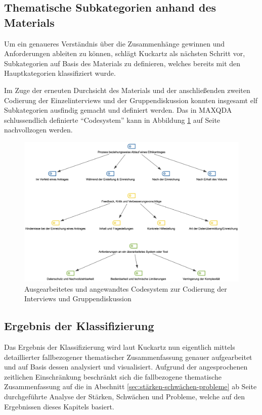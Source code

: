\documentclass[a4paper,12pt,twoside]{scrreprt}
\begin{document}
\subsection{Thematische Subkategorien anhand des Materials}
\label{sub-sec:thematische-subkategorien}

Um ein genaueres Verständnis über die Zusammenhänge gewinnen und Anforderungen ableiten zu können, schlägt Kuckartz als nächsten Schritt vor, Subkategorien auf Basis des Materials zu definieren, welches bereits mit den Hauptkategorien klassifiziert wurde. \cite[106]{kuckartz_qualitative_2018}

Im Zuge der erneuten Durchsicht des Materials und der anschließenden zweiten Codierung der Einzelinterviews und der Gruppendiskussion konnten insgesamt elf Subkategorien ausfindig gemacht und definiert werden. Das in MAXQDA schlussendlich definierte \enquote{Codesystem} kann in Abbildung \ref{fig:angewandtes-codesystem} auf Seite \pageref{fig:angewandtes-codesystem} nachvollzogen werden.

\begin{figure}[ht]
    \centering
    \includegraphics[width=\linewidth]{thesis/images/Luidold_Codesystem.png}
    \caption{Ausgearbeitetes und angewandtes Codesystem zur Codierung der Interviews und Gruppendiskussion}
    \label{fig:angewandtes-codesystem}
\end{figure}

\subsection{Ergebnis der Klassifizierung}
\label{sub-sec:ergebnis-klassifizierung}

Das Ergebnis der Klassifizierung wird laut Kuckartz nun eigentlich mittels detaillierter fallbezogener thematischer Zusammenfassung genauer aufgearbeitet und auf Basis dessen analysiert und visualisiert. \cite[111-121]{kuckartz_qualitative_2018} Aufgrund der angesprochenen zeitlichen Einschränkung beschränkt sich die fallbezogene thematische Zusammenfassung auf die in Abschnitt \ref{sec:stärken-schwächen-probleme} ab Seite \pageref{sec:stärken-schwächen-probleme} durchgeführte Analyse der Stärken, Schwächen und Probleme, welche auf den Ergebnissen dieses Kapitels basiert.
\end{document}
